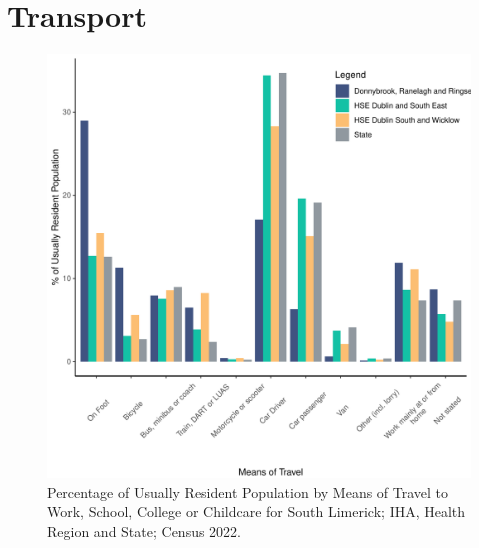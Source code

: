 \documentclass{article}
\begin{document}
\section{Transport}\label{sect:Trans}
\begin{figure}[H]
	\centering
	\includegraphics[width = 120mm]{../figures/TravelED.pdf}
	\caption{Percentage of Usually Resident Population by Means of Travel to Work, School, College or Childcare for South Limerick; IHA, Health Region and State; Census 2022.}
	\label{fig:vbnv}
	\end{figure}
\end{document}
